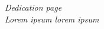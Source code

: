 \clearpage\pagebreak

\null\vfill
\begin{flushright}
\textit{Dedication page \\
Lorem ipsum lorem ipsum}
\end{flushright}
\vfill

\clearpage\pagebreak
